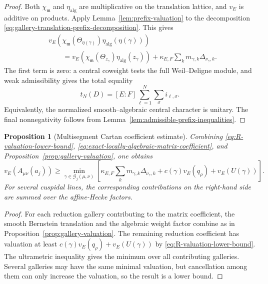 \documentclass[12pt]{article}
\newtheorem{proposition}[theorem]{Proposition}
\theoremstyle{definition}
\theoremstyle{remark}
\begin{document}
\begin{proof}
Both \(\chi_{\mathfrak m}\) and \(\eta_{\mathrm{alg}}\) are multiplicative
on the translation lattice, and \(v_E\) is additive on products.  Apply
Lemma~\ref{lem:prefix-valuation} to the decomposition
\eqref{eq:gallery-translation-prefix-decomposition}.  This gives
\begin{align*}
 &v_E\left(
 \chi_{\mathfrak m}(\Theta_{\eta(\gamma)})
 \eta_{\mathrm{alg}}(\eta(\gamma))
 \right)\\
 &\qquad=
 v_E\left(
 \chi_{\mathfrak m}(\Theta_{z_\gamma})
 \eta_{\mathrm{alg}}(z_\gamma)
 \right)
 +\kappa_{E,F}
 \sum_km_{\gamma,k}\Delta_{\nu_\gamma,k}.
\end{align*}
The first term is zero: a central coweight tests the full
Weil--Deligne module, and weak admissibility gives the total equality
\[
 t_N(D)
 =[E:F]\sum_{\ell=1}^{N}\sum_\sigma i_{\ell,\sigma}.
\]
Equivalently, the normalized smooth--algebraic central character is unitary.
The final nonnegativity follows from
Lemma~\ref{lem:admissible-prefix-inequalities}.
\end{proof}

\begin{proposition}[Multisegment Cartan coefficient estimate]
\label{prop:multisegment-Cartan-coefficient-estimate}
Combining
\eqref{eq:R-valuation-lower-bound},
\eqref{eq:exact-locally-algebraic-matrix-coefficient},
and Proposition~\ref{prop:gallery-valuation}, one obtains
\begin{equation}\label{eq:multisegment-A-valuation}
 \boxed{
 v_E(A_{\mu\nu}(a_j))
 \geq
 \min_{\gamma\in\mathcal G_j(\mu,\nu)}
 \left[
 \kappa_{E,F}
 \sum_km_{\gamma,k}\Delta_{\nu_\gamma,k}
 +
 c(\gamma)v_E(q_\rho)
 +
 v_E(U(\gamma))
 \right].
 }
\end{equation}
For several cuspidal lines, the corresponding contributions on the
right-hand side are summed over the affine-Hecke factors.
\end{proposition}

\begin{proof}
For each reduction gallery contributing to the matrix coefficient, the
smooth Bernstein translation and the algebraic weight factor combine as in
Proposition~\ref{prop:gallery-valuation}.  The remaining reduction
coefficient has valuation at least
\(c(\gamma)v_E(q_\rho)+v_E(U(\gamma))\) by
\eqref{eq:R-valuation-lower-bound}.  The ultrametric inequality gives the
minimum over all contributing galleries.  Several galleries may have the
same minimal valuation, but cancellation among them can only increase the
valuation, so the result is a lower bound.
\end{proof}
\end{document}
